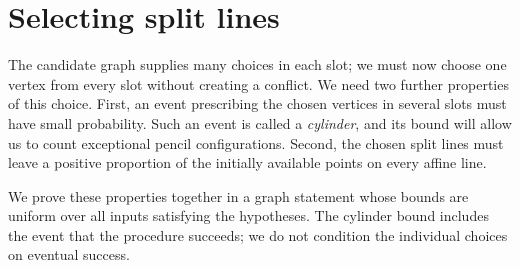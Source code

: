 \section{Selecting split lines}\label{sec:selection}

The candidate graph supplies many choices in each slot; we must now
choose one vertex from every slot without creating a conflict.  We need
two further properties of this choice.  First, an event prescribing the
chosen vertices in several slots must have small probability.  Such an
event is called a \emph{cylinder}, and its bound will allow us to count
exceptional pencil configurations.  Second, the chosen split lines must
leave a positive proportion of the initially available points on every
affine line.

We prove these properties together in a graph statement whose bounds are
uniform over all inputs satisfying the hypotheses.  The cylinder bound
includes the event that the procedure succeeds; we do not condition the
individual choices on eventual success.

